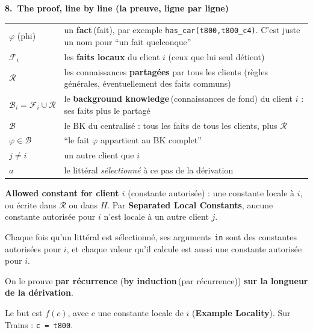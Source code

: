 \documentclass[10pt]{article}
\newcommand{\EN}[2]{\textbf{#1}\,{\scriptsize\textcolor{marine}{(#2)}}}
\newcommand{\titrebox}[2]{\needspace{10\baselineskip}\vspace{8pt}
  \begin{tcolorbox}[colback=marine, colframe=marine, arc=0pt, boxrule=0pt,
    top=4pt, bottom=4pt, left=8pt]
  \color{white}\Large\bfseries #1.~#2
  \end{tcolorbox}\vspace{2pt}}
\newcommand{\st}[1]{\par\needspace{7\baselineskip}\vspace{5pt}{\normalsize\bfseries\textcolor{marine}{#1}}\par\vspace{2pt}}
\begin{document}
\titrebox{8}{The proof, line by line (la preuve, ligne par ligne)}

\st{Notation (les symboles)}
\renewcommand{\arraystretch}{1.25}
\begin{tabular}{@{}L{3.2cm}L{13.2cm}@{}}
$\varphi$ (phi) & un \EN{fact}{fait}, par exemple \texttt{has\_car(t800,t800\_c4)}. C'est juste un nom pour ``un fait quelconque''\\
$\mathcal{F}_i$ & les \textbf{faits locaux} du client $i$ (ceux que lui seul détient)\\
$\mathcal{R}$ & les connaissances \textbf{partagées} par tous les clients (règles générales, éventuellement des faits communs)\\
$\mathcal{B}_i=\mathcal{F}_i\cup\mathcal{R}$ & le \EN{background knowledge}{connaissances de fond} du client $i$ : ses faits plus le partagé\\
$\mathcal{B}$ & le BK du centralisé : tous les faits de tous les clients, plus $\mathcal{R}$\\
$\varphi\in\mathcal{B}$ & ``le fait $\varphi$ appartient au BK complet''\\
$j\neq i$ & un autre client que $i$\\
$a$ & le littéral \emph{sélectionné} à ce pas de la dérivation\\
\end{tabular}

\st{Definitions used in the proof}
\textbf{Allowed constant for client $i$} (constante autorisée) : une constante locale à $i$, ou écrite dans
$\mathcal{R}$ ou dans $H$. Par \textbf{Separated Local Constants}, aucune constante autorisée pour $i$ n'est
locale à un autre client $j$.

\st{Invariant}
\begin{dire}
Chaque fois qu'un littéral est sélectionné, ses arguments \texttt{in} sont des constantes autorisées pour $i$,
et chaque valeur qu'il calcule est aussi une constante autorisée pour $i$.
\end{dire}
On le prouve \textbf{par récurrence} (\EN{by induction}{par récurrence}) \textbf{sur la longueur de la dérivation}.

\st{Base case (cas de base)}
Le but est $f(c)$, avec $c$ une constante locale de $i$ (\textbf{Example Locality}). Sur Trains : \texttt{c = t800}.
\end{document}
